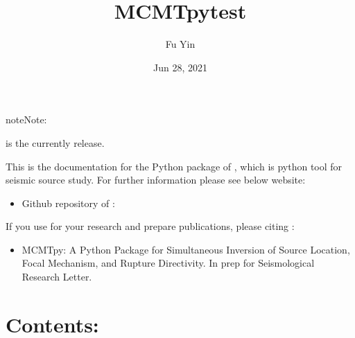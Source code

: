 \documentclass[a4paper,10pt,english,openany]{sphinxmanual}
\title{MCMTpy\sphinxhyphen{}test}
\date{Jun 28, 2021}
\author{Fu Yin}
\begin{document}
\pagestyle{empty}
\sphinxmaketitle
\pagestyle{plain}
\sphinxtableofcontents
\pagestyle{normal}
\label{\detokenize{index::doc}}



\begin{sphinxadmonition}{note}{Note:}
%
\begin{footnote}[1]\sphinxAtStartFootnote
{}
%
\end{footnote}
is the currently release.
\end{sphinxadmonition}

This is the documentation for the Python package of , which is python tool for seismic source study.
For further information please see below website:
\begin{itemize}
\item {} 
Github repository of : 

\end{itemize}

If you use  for your research and prepare publications, please citing :
\begin{itemize}
\item {} 
MCMTpy: A Python Package for Simultaneous Inversion of Source Location, Focal Mechanism, and Rupture Directivity.
In prep for Seismological Research Letter.

\end{itemize}


\chapter{Contents:}
\label{\detokenize{index:contents}}
\end{document}
